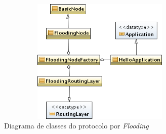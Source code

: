 \begin{figure}[H]
\centering
\includegraphics[height=6cm,width=10cm]{FloodingRoutingcd.png}
\caption{Diagrama de classes do protocolo por \textit{Flooding}}
\label{fig:floodingcd}
\end{figure}